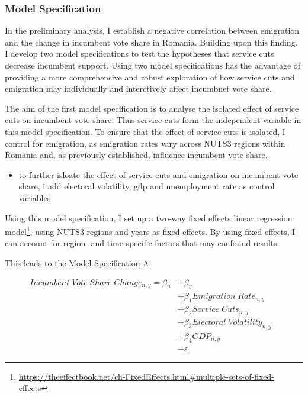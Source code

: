 \documentclass[
]{article}
\author{}
\date{\vspace{-2.5em}}
\providecommand{\tightlist}{%
  \setlength{\itemsep}{0pt}\setlength{\parskip}{0pt}}
\begin{document}
\hypertarget{model-specification}{%
\subsubsection{Model Specification}\label{model-specification}}

In the preliminary analysis, I establish a negative correlation between
emigration and the change in incumbent vote share in Romania. Building
upon this finding, I develop two model specifications to test the
hypotheses that service cuts decrease incumbent support. Using two model
specifications has the advantage of providing a more comprehensive and
robust exploration of how service cuts and emigration may individually
and interctively affect incumbnet vote share.

The aim of the first model specification is to analyse the isolated
effect of service cuts on incumbent vote share. Thus service cuts form
the independent variable in this model specification. To ensure that the
effect of service cuts is isolated, I control for emigration, as
emigration rates vary across NUTS3 regions within Romania and, as
previously established, influence incumbent vote share.

\begin{itemize}
\tightlist
\item
  to further isloate the effect of service cuts and emigration on
  incumbent vote share, i add electoral volatility, gdp and unemployment
  rate as control variables
\end{itemize}

Using this model specification, I set up a two-way fixed effects linear
regression model\footnote{\url{https://theeffectbook.net/ch-FixedEffects.html\#multiple-sets-of-fixed-effects}},
using NUTS3 regions and years as fixed effects. By using fixed effects,
I can account for region- and time-specific factors that may confound
results.

This leads to the Model Specification A:

\begin{equation*}
\begin{aligned}
Incumbent \; Vote \; Share \; Change_{n,y} = \beta_n & + \beta_y & \\
& + \beta_1Emigration \; Rate_{n, y} \\
& + \beta_2Service \; Cuts_{n, y} \\
& + \beta_3Electoral \; Volatility_{n, y} \\
& + \beta_4GDP_{n, y} \\
& + \varepsilon
\end{aligned}
\end{equation*}
\end{document}
